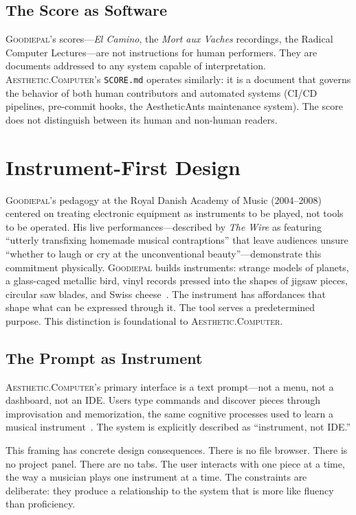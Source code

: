 \documentclass[10pt,letterpaper,twocolumn]{article}
\newcommand{\ac}{\textsc{Aesthetic.Computer}}
\newcommand{\gp}{\textsc{Goodiepal}}
\begin{document}
\subsection{The Score as Software}

\gp{}'s scores---\emph{El Camino}, the \emph{Mort aux Vaches} recordings, the Radical Computer Lectures---are not instructions for human performers. They are documents addressed to any system capable of interpretation. \ac{}'s \texttt{SCORE.md} operates similarly: it is a document that governs the behavior of both human contributors and automated systems (CI/CD pipelines, pre-commit hooks, the AestheticAnts maintenance system). The score does not distinguish between its human and non-human readers.

\section{Instrument-First Design}

\gp{}'s pedagogy at the Royal Danish Academy of Music (2004--2008) centered on treating electronic equipment as instruments to be played, not tools to be operated. His live performances---described by \emph{The Wire} as featuring ``utterly transfixing homemade musical contraptions'' that leave audiences unsure ``whether to laugh or cry at the unconventional beauty''---demonstrate this commitment physically. \gp{} builds instruments: strange models of planets, a glass-caged metallic bird, vinyl records pressed into the shapes of jigsaw pieces, circular saw blades, and Swiss cheese~\citep{inspite2024goodiepal}. The instrument has affordances that shape what can be expressed through it. The tool serves a predetermined purpose. This distinction is foundational to \ac{}.

\subsection{The Prompt as Instrument}

\ac{}'s primary interface is a text prompt---not a menu, not a dashboard, not an IDE. Users type commands and discover pieces through improvisation and memorization, the same cognitive processes used to learn a musical instrument~\citep{scudder2026ac}. The system is explicitly described as ``instrument, not IDE.''

This framing has concrete design consequences. There is no file browser. There is no project panel. There are no tabs. The user interacts with one piece at a time, the way a musician plays one instrument at a time. The constraints are deliberate: they produce a relationship to the system that is more like fluency than proficiency.
\end{document}
